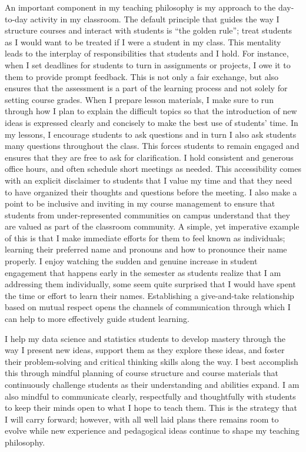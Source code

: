 \documentclass[letterpaper,12pt]{article}\usepackage[]{graphicx}\usepackage[]{color}
\begin{document}
\indent	An important component in my teaching philosophy is my approach to the day-to-day activity in my classroom.  The default principle that guides the way I structure courses and interact with students is ``the golden rule''; treat students as I would want to be treated if I were a student in my class. This mentality leads to the interplay of responsibilities that students and I hold. For instance, when I set deadlines for students to turn in assignments or projects, I owe it to them to provide prompt feedback.  This is not only a fair exchange, but also ensures that the assessment is a part of the learning process and not solely for setting course grades. When I prepare lesson materials, I make sure to run through how I plan to explain the difficult topics so that the introduction of new ideas is expressed clearly and concisely to make the best use of students' time. In my lessons, I encourage students to ask questions and in turn I also ask students many questions throughout the class.  This forces students to remain engaged and ensures that they are free to ask for clarification. I hold consistent and generous office hours, and often schedule short meetings as needed. This accessibility comes with an explicit disclaimer to students that I value my time and that they need to have organized their thoughts and questions before the meeting. I also make a point to be inclusive and inviting in my course management to ensure that students from under-represented communities on campus understand that they are valued as part of the classroom community. A simple, yet imperative example of this is that I make immediate efforts for them to feel known as individuals; learning their preferred name and pronouns and how to pronounce their name properly. I enjoy watching the sudden and genuine increase in student engagement that happens early in the semester as students realize that I am addressing them individually, some seem quite surprised that I would have spent the time or effort to learn their names. Establishing a give-and-take relationship based on mutual respect opens the channels of communication through which I can help to more effectively guide student learning. 


I help my data science and statistics students to develop mastery through the way I present new ideas, support them as they explore these ideas, and foster their problem-solving and critical thinking skills along the way. I best accomplish this through mindful planning of course structure and course materials that continuously challenge students as their understanding and abilities expand. I am also mindful to communicate clearly, respectfully and thoughtfully with students to keep their minds open to what I hope to teach them. This is the strategy that I will carry forward; however, with all well laid plans there remains room to evolve while new experience and pedagogical ideas continue to shape my teaching philosophy.


% 
% 
\end{document}
